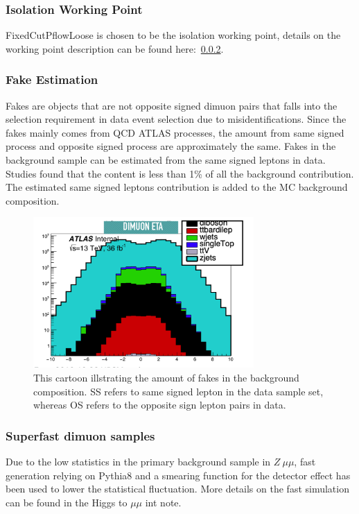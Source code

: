 \subsubsection*{Isolation Working Point}
FixedCutPflowLoose is chosen to be the isolation working point, details on the working point description can be found here:~\ref{}. 


\subsubsection{Fake Estimation}
Fakes are objects that are not opposite signed dimuon pairs that falls into the selection requirement in data event selection due to misidentifications.
Since the fakes mainly comes from QCD ATLAS processes, the amount from same signed process and opposite signed process are approximately the same. 
Fakes in the background sample can be estimated from the same signed leptons in data. Studies found that the content is less than 1\% of all the background contribution. The estimated same signed leptons contribution is added to the MC background composition.

\begin{figure}[!htb]
    \begin{center}
        \includegraphics[width=0.75\textwidth]{figures/chapter_dimuon/backgroundcomposition}
        \caption{
        This cartoon illstrating the amount of fakes in the background composition. SS refers to same signed lepton in the data sample set, whereas OS refers to the opposite sign lepton pairs in data. }
    \end{center}
\end{figure}

\subsubsection{Superfast dimuon samples}
Due to the low statistics in the primary background sample in  $Z \> \mu \mu$, fast generation relying on Pythia8 and a smearing function for the detector effect has been used to lower the statistical fluctuation. More details on the fast simulation can be found in the Higgs to $\mu \mu $ int note.

